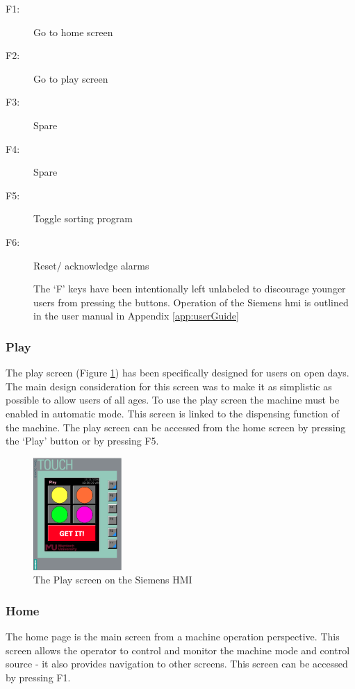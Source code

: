         \begin{description}

        \item[F1:] Go to home screen
        \item[F2:] Go to play screen
        \item[F3:] Spare 
        \item[F4:] Spare
        \item[F5:] Toggle sorting program
        \item[F6:] Reset/ acknowledge alarms
        
        The `F' keys have been intentionally left unlabeled to discourage younger users from pressing the buttons. 
        Operation of the Siemens \acrshort{hmi} is outlined in the user manual in Appendix \ref{app:userGuide}
        
        \end{description}

        \subsubsection{Play}
        The play screen (Figure \ref{fig:hmiPlay}) has been specifically designed for users on open days. The main design consideration for this screen was to make it as simplistic as possible to allow users of all ages. To use the play screen the machine must be enabled in automatic mode. This screen is linked to the dispensing function of the machine.  The play screen can be accessed from the home screen by pressing the `Play' button or by pressing F5. 
        
        \begin{figure}[H]
            \centering
            \includegraphics[width = 0.3\textwidth]{2_images/hmiPlay}
            \caption{The Play screen on the Siemens HMI}
            \label{fig:hmiPlay}
        \end{figure} 

        \subsubsection{Home}
            The home page is the main screen from a machine operation perspective. This screen allows the operator to control and monitor the machine mode and control source - it also provides navigation to other screens. This screen can be accessed by pressing F1.  
        
